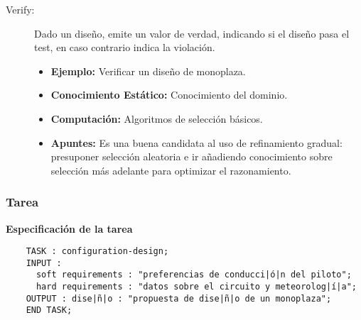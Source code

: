 \documentclass[12pt,a4paper,twoside,spanish]{article}      %
\begin{document}
\begin{description}
\begin{itemize}
        \end{itemize}
    \item [Verify:] Dado un diseño, emite un valor de verdad, indicando si el diseño pasa el test, en caso contrario indica la violación.
        \begin{itemize}
            \item \textbf {Ejemplo:} Verificar un diseño de monoplaza.
            \item \textbf {Conocimiento Estático:} Conocimiento del dominio.
            \item \textbf {Computación:}  Algoritmos de selección básicos.
            \item \textbf {Apuntes:} Es una buena candidata al uso de refinamiento gradual: presuponer selección aleatoria e ir añadiendo conocimiento sobre selección más adelante para optimizar el razonamiento.
        \end{itemize}
\end{description}

\newpage
\subsubsection{Tarea}

\textbf {Especificación de la tarea}
\begin{lstlisting}
    TASK : configuration-design;
    INPUT :
      soft requirements : "preferencias de conducci|ó|n del piloto";
      hard requirements : "datos sobre el circuito y meteorolog|í|a";
    OUTPUT : dise|ñ|o : "propuesta de dise|ñ|o de un monoplaza";
    END TASK;
\end{lstlisting}
\end{document}
